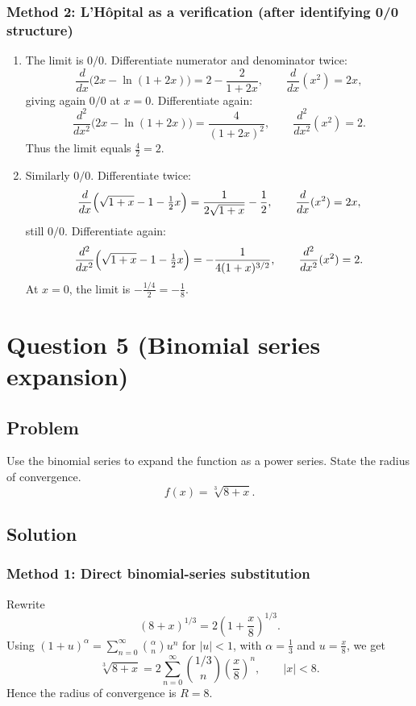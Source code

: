 \documentclass[12pt]{article}
\begin{document}
\subsubsection*{Method 2: L'H\^{o}pital as a verification (after identifying 0/0 structure)}
\begin{enumerate}[label=(\alph*)]
\item The limit is \(0/0\). Differentiate numerator and denominator twice:
\[
\frac{d}{dx}\bigl(2x-\ln(1+2x)\bigr)=2-\frac{2}{1+2x},\qquad \frac{d}{dx}(x^2)=2x,
\]
giving again \(0/0\) at \(x=0\). Differentiate again:
\[
\frac{d^2}{dx^2}\bigl(2x-\ln(1+2x)\bigr)=\frac{4}{(1+2x)^2},\qquad \frac{d^2}{dx^2}(x^2)=2.
\]
Thus the limit equals \(\frac{4}{2}=2\).

\item Similarly \(0/0\). Differentiate twice:
\[
\frac{d}{dx}\Bigl(\sqrt{1+x}-1-\tfrac12 x\Bigr)=\frac{1}{2\sqrt{1+x}}-\frac12,\qquad \frac{d}{dx}(x^2)=2x,
\]
still \(0/0\). Differentiate again:
\[
\frac{d^2}{dx^2}\Bigl(\sqrt{1+x}-1-\tfrac12 x\Bigr)=-\frac{1}{4(1+x)^{3/2}},\qquad \frac{d^2}{dx^2}(x^2)=2.
\]
At \(x=0\), the limit is \(-\frac{1/4}{2}=-\frac18\).
\end{enumerate}

\newpage
\section*{Question 5 (Binomial series expansion)}
\subsection*{Problem}
Use the binomial series to expand the function as a power series. State the radius of convergence.
\[
f(x)=\sqrt[3]{8+x}.
\]

\subsection*{Solution}

\subsubsection*{Method 1: Direct binomial-series substitution}
Rewrite
\[
(8+x)^{1/3}=2\left(1+\frac{x}{8}\right)^{1/3}.
\]
Using \((1+u)^{\alpha}=\sum_{n=0}^\infty \binom{\alpha}{n}u^n\) for \(|u|<1\), with \(\alpha=\frac13\) and \(u=\frac{x}{8}\), we get
\[
\boxed{\sqrt[3]{8+x}=2\sum_{n=0}^{\infty}\binom{1/3}{n}\left(\frac{x}{8}\right)^n},
\qquad |x|<8.
\]
Hence the radius of convergence is \(\boxed{R=8}\).
\end{document}

